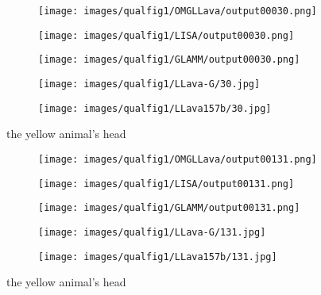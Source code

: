 \begin{figure*}[t]
\begin{subfigure}{0.19\textwidth}
\texttt{[image: images/qualfig1/OMGLLava/output00030.png]}
\end{subfigure}%
\begin{subfigure}{0.19\textwidth}
\texttt{[image: images/qualfig1/LISA/output00030.png]}
\end{subfigure}%
\begin{subfigure}{0.19\textwidth}
\texttt{[image: images/qualfig1/GLAMM/output00030.png]}
\end{subfigure}%
\begin{subfigure}{0.19\textwidth}
\texttt{[image: images/qualfig1/LLava-G/30.jpg]}
\end{subfigure}%
\begin{subfigure}{0.19\textwidth}
\texttt{[image: images/qualfig1/LLava157b/30.jpg]}
\end{subfigure}

the yellow animal's head

\begin{subfigure}{0.19\textwidth}
\texttt{[image: images/qualfig1/OMGLLava/output00131.png]}
\end{subfigure}%
\begin{subfigure}{0.19\textwidth}
\texttt{[image: images/qualfig1/LISA/output00131.png]}
\end{subfigure}%
\begin{subfigure}{0.19\textwidth}
\texttt{[image: images/qualfig1/GLAMM/output00131.png]}
\end{subfigure}%
\begin{subfigure}{0.19\textwidth}
\texttt{[image: images/qualfig1/LLava-G/131.jpg]}
\end{subfigure}%
\begin{subfigure}{0.19\textwidth}
\texttt{[image: images/qualfig1/LLava157b/131.jpg]}
\end{subfigure}

the yellow animal's head


\end{figure*}

